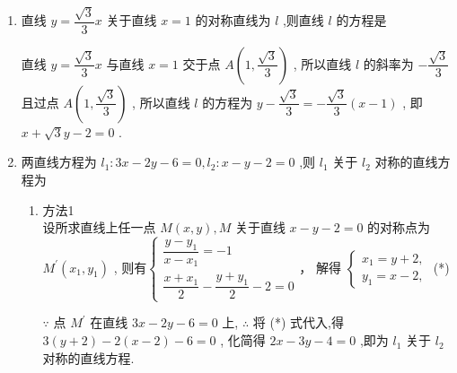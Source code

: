 \begin{enumerate}
\begin{enumerate}
        \item 直线 $y = \dfrac{\sqrt{3}}{3}x$ 关于直线 $x = 1$ 的对称直线为 $l$ ,则直线 $l$ 的方程是
        \begin{jieda}
            直线 $y = \dfrac{\sqrt{3}}{3}x$ 与直线 $x = 1$ 交于点 $A\left( {1,\dfrac{\sqrt{3}}{3}}\right)$ ,
            所以直线 $l$ 的斜率为 $- \dfrac{\sqrt{3}}{3}$ 且过点 $A\left( {1,\dfrac{\sqrt{3}}{3}}\right)$ ,
            所以直线 $l$ 的方程为 $y - \dfrac{\sqrt{3}}{3} =  - \dfrac{\sqrt{3}}{3}\left( {x - 1}\right)$ ,
            即 $x + \sqrt{3}y - 2 = 0$ .
        \end{jieda}
        \item 两直线方程为 ${l}_{1} : {3x} - {2y} - 6 = 0,{l}_{2} : x - y - 2 = 0$ ,则 ${l}_{1}$ 关于 ${l}_{2}$ 对称的直线方程为
        \begin{jieda}
            \begin{enumerate}
                \item 方法1 \\
                设所求直线上任一点 $M\left( {x,y}\right) ,M$ 关于直线 $x - y - 2 = 0$ 的对称点为 ${M}^{\prime }\left( {{x}_{1},{y}_{1}}\right)$ , 则有$\left\{\begin{array}{l}
                 \dfrac{y-y_1}{x-x_1} = -1 \\
                 \dfrac{x+x_1}{2}-\dfrac{y+y_1}{2}-2=0
                \end{array}\right.$，
                解得 $\left\{  \begin{array}{l} {x}_{1} = y + 2, \\  {y}_{1} = x - 2, \end{array}\right.$ (*)
                
                $\because$ 点 ${M}^{\prime }$ 在直线 ${3x} - {2y} - 6 = 0$ 上,
                $\therefore$ 将 (*) 式代入,得 $3\left( {y + 2}\right)  - 2\left( {x - 2}\right)  - 6 = 0$ ,
                化简得 ${2x} - {3y} - 4 = 0$ ,即为 ${l}_{1}$ 关于 ${l}_{2}$ 对称的直线方程.
    

\end{enumerate}
\end{jieda}
\end{enumerate}
\end{enumerate}
